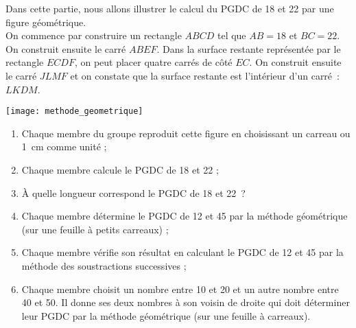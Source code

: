 
\begin{TP}

Dans cette partie, nous allons illustrer le calcul du PGDC de 18 et 22 par une figure géométrique.\\[0.5em]
On commence par construire un rectangle $ABCD$ tel que $AB = 18$ et $BC = 22$. On construit ensuite le carré $ABEF$. Dans la surface restante représentée par le rectangle $ECDF$, on peut placer quatre carrés de côté $EC$. On construit ensuite le carré $JLMF$ et on constate que la surface restante est l'intérieur d'un carré : \textcolor{C2}{$LKDM$}.
\begin{center} \texttt{[image: methode\_geometrique]} \end{center}

\begin{enumerate}
 \item Chaque membre du groupe reproduit cette figure en choisissant un carreau ou 1 cm comme unité ;
 \item Chaque membre calcule le PGDC de 18 et 22 ;
 \item À quelle longueur correspond le PGDC de 18 et 22 ?
 

 \item Chaque membre détermine le PGDC de 12 et 45 par la méthode géométrique (sur une feuille à petits carreaux) ;
 \item Chaque membre vérifie son résultat en calculant le PGDC de 12 et 45 par la méthode des soustractions successives ;
 \item Chaque membre choisit un nombre entre 10 et 20 et un autre nombre entre 40 et 50. Il donne ses deux nombres à son voisin de droite qui doit déterminer leur PGDC par la méthode géométrique (sur une feuille à carreaux).
 \end{enumerate}
 
\end{TP}


